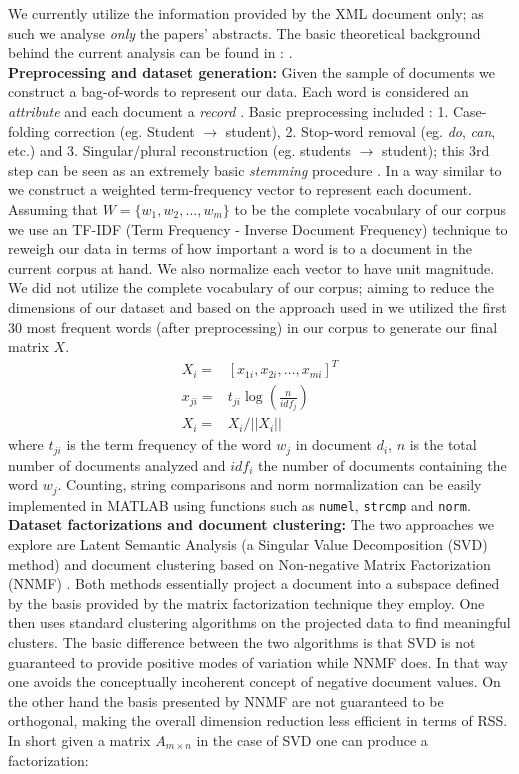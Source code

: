 \documentclass[11pt,english]{article}
\begin{document}
We currently utilize the information provided by the XML document only; as such we analyse \textit{only} the papers' abstracts. The basic theoretical background behind the current analysis can be found in : \cite{manning2008introduction,landauer1998introduction}. \\
\textbf{Preprocessing and dataset generation:}
Given the sample of documents we construct a bag-of-words to represent our data.  
Each word is considered an \textit{attribute} and each document a \textit{record} \cite{LaroccaNeto2000a}. 
Basic preprocessing included : 1. Case-folding correction (eg. Student $\rightarrow$ student), 2. Stop-word removal (eg. \textit{do}, \textit{can}, etc.) and 3. Singular/plural reconstruction (eg. students $\rightarrow$ student); this 3rd step can be seen as an extremely basic \textit{stemming} procedure \cite{LaroccaNeto2000a}. 
In a way similar to \cite{xu2003document} we construct a weighted term-frequency vector to represent each document. Assuming that $W = \{w_1, w_2, \dots, w_m\}$ to be the complete vocabulary of our corpus we use an TF-IDF (Term Frequency - Inverse Document Frequency) technique to reweigh our data in terms of how important a word is to a document in the current corpus at hand. We also normalize each vector to have unit magnitude. We did not utilize the complete vocabulary of our corpus; aiming to reduce the dimensions of our dataset and based on the approach used in \cite{fung2003hierarchical} we utilized the first 30 most frequent words (after preprocessing) in our corpus to generate our final matrix $X$. 
\begin{align*}
X_i =& [x_{1i}, x_{2i}, \dots, x_{mi}]^T\\
x_{ji} =& t_{ji} \log(\frac{n}{idf_j})\\
X_i =& X_i / ||X_i||
\end{align*} 
where $t_{ji}$ is the term frequency of the word $w_j$ in document $d_i$, $n$ is the total number of documents analyzed and $idf_i$ the number of documents containing the word $w_j$. Counting, string comparisons and norm normalization can be easily implemented in MATLAB using functions such as \texttt{numel}, \texttt{strcmp} and \texttt{norm}.\\
\textbf{Dataset factorizations and document clustering:}
The two approaches we explore are Latent Semantic Analysis \cite{landauer1998introduction} (a Singular Value Decomposition (SVD) method) and document clustering based on Non-negative Matrix Factorization (NNMF) \cite{xu2003document}. Both methods essentially project a document into a subspace defined by the basis provided by the matrix factorization technique they employ. One then uses standard clustering algorithms on the projected data to find meaningful clusters. The basic difference between the two algorithms is that SVD is not guaranteed to provide positive modes of variation while NNMF does. In that way one avoids the conceptually incoherent concept of negative document values. On the other hand the basis presented by NNMF are not guaranteed to be orthogonal, making the overall dimension reduction less efficient in terms of RSS. In short given a matrix $A_{m \times n}$ in the case of SVD one can produce a factorization:
\end{document}
